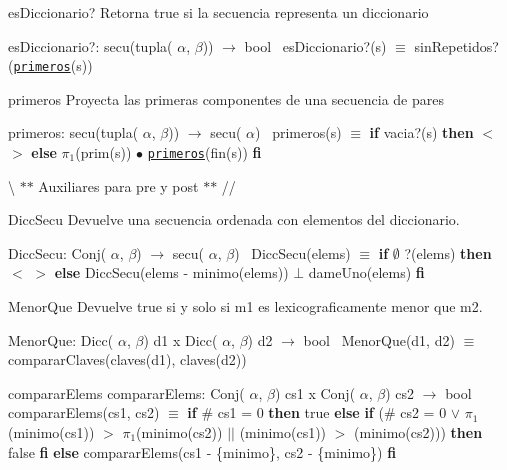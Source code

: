 \begin{DoxyParagraph}{es\+Diccionario?}
Retorna true si la secuencia representa un diccionario

es\+Diccionario?\+: secu(tupla( $\alpha$, $\beta$)) $\to$ bool~\newline
es\+Diccionario?(s) $\equiv$ sin\+Repetidos?(\href{axiomas.html#primeros}{\tt primeros}(s)) 
\end{DoxyParagraph}


\begin{DoxyParagraph}{primeros}
Proyecta las primeras componentes de una secuencia de pares

primeros\+: secu(tupla( $\alpha$, $\beta$)) $\to$ secu( $\alpha$)~\newline
primeros(s) $\equiv$ {\bfseries if} vacia?(s) {\bfseries then} $<$$>$ {\bfseries else} $\pi_1$(prim(s)) $\bullet$ \href{axiomas.html#primeros}{\tt primeros}(fin(s)) {\bfseries fi} 
\end{DoxyParagraph}


\textbackslash{} $\ast$$\ast$ Auxiliares para pre y post $\ast$$\ast$ // \begin{DoxyParagraph}{Dicc\+Secu}
Devuelve una secuencia ordenada con elementos del diccionario.

Dicc\+Secu\+: Conj( $\alpha$, $\beta$) $\to$ secu( $\alpha$, $\beta$)~\newline
Dicc\+Secu(elems) $\equiv$ {\bfseries if} $\emptyset$ ?(elems) {\bfseries then} $<$ $>$ {\bfseries else} Dicc\+Secu(elems -\/ minimo(elems)) $\bot$ dame\+Uno(elems) {\bfseries fi} 
\end{DoxyParagraph}


\begin{DoxyParagraph}{Menor\+Que}
Devuelve true si y solo si m1 es lexicograficamente menor que m2.

Menor\+Que\+: Dicc( $\alpha$, $\beta$) d1 x Dicc( $\alpha$, $\beta$) d2 $\to$ bool~\newline
Menor\+Que(d1, d2) $\equiv$ comparar\+Claves(claves(d1), claves(d2)) 
\end{DoxyParagraph}


\begin{DoxyParagraph}{comparar\+Elems}
comparar\+Elems\+: Conj( $\alpha$, $\beta$) cs1 x Conj( $\alpha$, $\beta$) cs2 $\to$ bool~\newline
comparar\+Elems(cs1, cs2) $\equiv$ {\bfseries if} \# cs1 = 0 {\bfseries then} true {\bfseries else} {\bfseries if} (\# cs2 = 0 $\lor$ $\pi_1$(minimo(cs1)) $>$ $\pi_1$(minimo(cs2)) $\vert$$\vert$ (minimo(cs1)) $>$ (minimo(cs2))) {\bfseries then} false {\bfseries fi} {\bfseries else} comparar\+Elems(cs1 -\/ \{minimo\}, cs2 -\/ \{minimo\}) {\bfseries fi} 
\end{DoxyParagraph}


